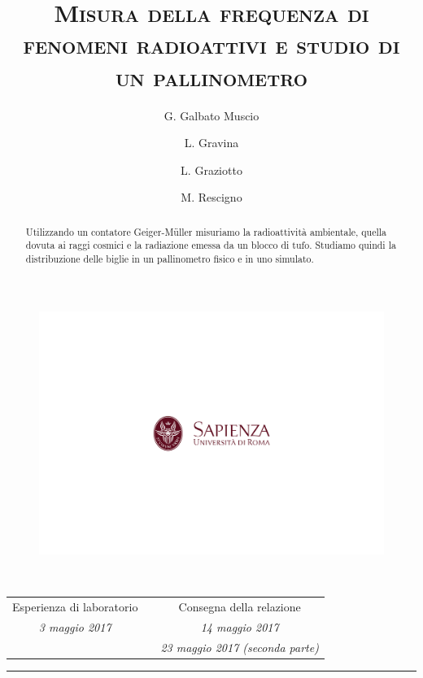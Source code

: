 \documentclass[10pt,oneside,a4paper]{article}
\title{\textsc{Misura della frequenza di fenomeni radioattivi e studio di un pallinometro}}
\author{\small{G. Galbato Muscio} \and \small{L. Gravina} \and \small{L. Graziotto} \and \small{M. Rescigno}}
\date{}
\begin{document}
	\begin{figure}
		\centering
		\includegraphics[scale=0.5, trim={2.8cm 8.9cm 0 9cm}, clip]{logo.png}
	\end{figure}
	\maketitle
	\begin{center} 
		 \\
		\vspace{1cm}
		\begin{tabular}{ccc}
			Esperienza di laboratorio && Consegna della relazione \\
			\emph{\small{3 maggio 2017}} && \emph{\small{14 maggio 2017}} \\
										&& 	\emph{\small{23 maggio 2017} (seconda parte)}  \\
		\end{tabular} 
		
		\vspace{0.5cm}
		
	\end{center}
\hrule
\vspace{0.5cm}
\begin{abstract}
Utilizzando un contatore Geiger-M\"uller misuriamo la radioattività  ambientale, quella dovuta ai raggi cosmici e la radiazione emessa da un blocco di tufo. Studiamo quindi la distribuzione delle biglie in un pallinometro fisico e in uno simulato.	
\end{abstract}
\newpage
\tableofcontents %
\listoftables %
\listoffigures %
\pagebreak
\end{document}
